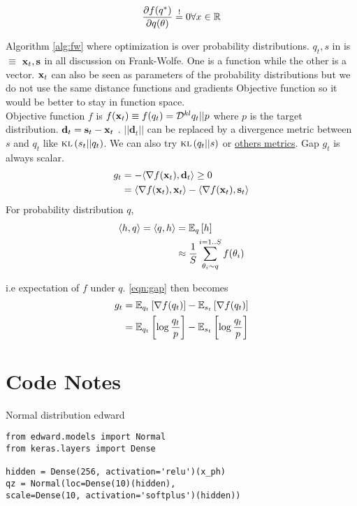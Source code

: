 \documentclass[summaries.tex]{subfiles}
\begin{document}
$$\frac{\partial f(q^\ast)}{\partial q (\theta)} \overset{!}{=} 0 \forall x \in \mathbb{R}$$

\INPROGRESS
Algorithm \ref{alg:fw} where optimization is over probability distributions. $q_t, s$ in
\cite{locatello2018boosting} is $\equiv$ $\mathbf{x}_t, \mathbf{s}$ in all discussion on Frank-Wolfe. One is a function
while the other is a vector. $\mathbf{x}_t$ can also be seen as parameters of the probability distributions
but we do not use the same distance functions and gradients Objective function so it would be better to
stay in function space.\\

Objective function $f$ is $f(\mathbf{x}_t) \equiv f(q_t) = \mathcal{D}^{kl}{q_t || p}$ where $p$ is the target
distribution. $\mathbf{d}_t = \mathbf{s}_t - \mathbf{x}_t$ . $||\mathbf{d}_t||$ can be replaced by a divergence metric between $s$ and $q_t$ like 
$\textsc{kl}\left(s_t || q_t\right)$. We can also try $\textsc{kl}\left(q_t||s\right)$ or
\href{https://en.wikipedia.org/wiki/Statistical_distance}{others metrics}. 
Gap $g_t$ is always scalar.
\begin{align}
    g_t &= -\langle \nabla f(\mathbf{x}_t), \mathbf{d}_t \rangle \geq 0 \nonumber\\
        &= \langle \nabla f(\mathbf{x}_t), \mathbf{x}_t \rangle - \langle \nabla f(\mathbf{x}_t), \mathbf{s}_t \rangle 
        \label{eqn:gap}
\end{align}
For probability distribution $q$, 
\begin{align}
   \langle h, q \rangle = 
   \langle q, h \rangle &= \mathbb{E}_{q}\left[h\right] \\
                        &\approx \frac{1}{S} \sum_{\theta_{i} \sim q}^{i=1..S} f(\theta_i)
\end{align}

i.e expectation of $f$ under $q$. \ref{eqn:gap} then becomes
\begin{align}
    g_t &= \mathbb{E}_{q_t}\left[\nabla f(q_t)\right] - \mathbb{E}_{s_t}\left[\nabla f(q_t)\right] \\
        &= \mathbb{E}_{q_t}\left[\log \frac{q_t}{p}\right] - \mathbb{E}_{s_t}\left[\log \frac{q_t}{p}\right]
\end{align}


\newpage
\section{Code Notes}
Normal distribution edward

\begin{verbatim}
from edward.models import Normal
from keras.layers import Dense

hidden = Dense(256, activation='relu')(x_ph)
qz = Normal(loc=Dense(10)(hidden),
scale=Dense(10, activation='softplus')(hidden))
\end{verbatim}
\end{document}
